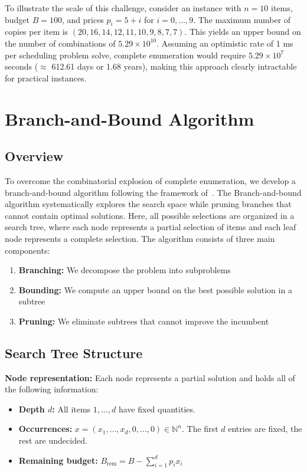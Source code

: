 To illustrate the scale of this challenge, consider an instance with $n=10$ items, budget $B=100$, and prices $p_i = 5+i$ for $i=0,\ldots,9$.
The maximum number of copies per item is $(20, 16, 14, 12, 11, 10, 9, 8, 7, 7)$.
This yields an upper bound on the number of combinations of $5.29 \times 10^{10}$.
Assuming an optimistic rate of 1 ms per scheduling problem solve, complete enumeration would require $5.29 \times 10^7$ seconds ($\approx$ 612.61 days or 1.68 years), making this approach clearly intractable for practical instances.

\section{Branch-and-Bound Algorithm}

\subsection{Overview}
To overcome the combinatorial explosion of complete enumeration, we develop a branch-and-bound algorithm following the framework of~\cite{weninger2025bilevel}.
The Branch-and-bound algorithm systematically explores the search space while pruning branches that cannot contain optimal solutions.
Here, all possible selections are organized in a search tree, where each node represents a partial selection of items and each leaf node represents a complete selection.
The algorithm consists of three main components:

\begin{enumerate}
    \item \textbf{Branching:} We decompose the problem into subproblems
    \item \textbf{Bounding:} We compute an upper bound on the best possible solution in a subtree
    \item \textbf{Pruning:} We eliminate subtrees that cannot improve the incumbent
\end{enumerate}

\subsection{Search Tree Structure}

\textbf{Node representation:} Each node represents a partial solution and holds all of the following information:
\begin{itemize}
    \item \textbf{Depth $d$:} All items $1, \ldots, d$ have fixed quantities.
    \item \textbf{Occurrences:} $x = (x_1, \ldots, x_d, 0, \ldots, 0) \in \mathbb{N}^n$. The first $d$ entries are fixed, the rest are undecided.
    \item \textbf{Remaining budget:} $B_{\text{rem}} = B - \sum_{i=1}^{d} p_i x_i$   
\end{itemize}

